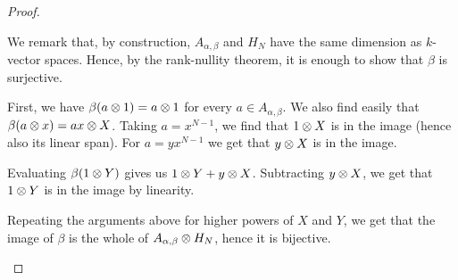 \begin{proof}
\begin{enumerate}[(i)]
    We remark that, by construction, \(A_{\alpha, \beta}\) and \(H_N\) have the same dimension as \(k\)-vector spaces. Hence, by the rank-nullity theorem, it is enough to show that \(\beta\) is surjective.

    First, we have \(\beta(a \otimes 1) = a \otimes 1\) for every \(a \in A_{\alpha, \beta}\). We also find easily that \(\beta(a \otimes x) = a x \otimes X\). Taking \(a = x^{N - 1}\), we find that \(1 \otimes X\) is in the image (hence also its linear span). For \(a = y x^{N - 1}\) we get that \(y \otimes X\) is in the image.

    Evaluating \(\beta(1 \otimes Y)\) gives us \(1 \otimes Y + y \otimes X\). Subtracting \(y \otimes X\), we get that \(1 \otimes Y\) is in the image by linearity.
    
    Repeating the arguments above for higher powers of \(X\) and \(Y\), we get that the image of \(\beta\) is the whole of \(A_{\alpha, \beta} \otimes H_N\), hence it is bijective.
\end{enumerate}
\end{proof}

